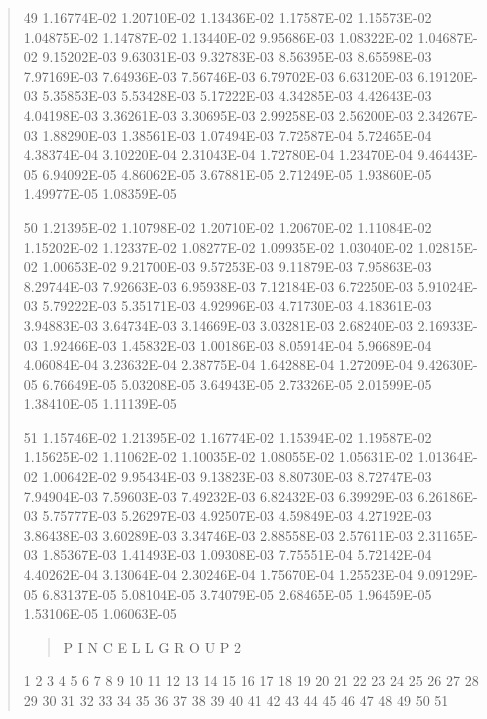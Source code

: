 \documentclass[letterpaper,10pt,english]{sphinxmanual}
\begin{document}
\begin{quote}
\begin{DUlineblock}{0em}
\item[] 49   1.16774E-02  1.20710E-02  1.13436E-02  1.17587E-02  1.15573E-02  1.04875E-02  1.14787E-02  1.13440E-02  9.95686E-03  1.08322E-02  1.04687E-02  9.15202E-03  9.63031E-03  9.32783E-03  8.56395E-03  8.65598E-03  7.97169E-03  7.64936E-03  7.56746E-03  6.79702E-03  6.63120E-03  6.19120E-03  5.35853E-03  5.53428E-03  5.17222E-03  4.34285E-03  4.42643E-03  4.04198E-03  3.36261E-03  3.30695E-03  2.99258E-03  2.56200E-03  2.34267E-03  1.88290E-03  1.38561E-03  1.07494E-03  7.72587E-04  5.72465E-04  4.38374E-04  3.10220E-04  2.31043E-04  1.72780E-04  1.23470E-04  9.46443E-05  6.94092E-05  4.86062E-05  3.67881E-05  2.71249E-05  1.93860E-05  1.49977E-05  1.08359E-05
\item[] 50   1.21395E-02  1.10798E-02  1.20710E-02  1.20670E-02  1.11084E-02  1.15202E-02  1.12337E-02  1.08277E-02  1.09935E-02  1.03040E-02  1.02815E-02  1.00653E-02  9.21700E-03  9.57253E-03  9.11879E-03  7.95863E-03  8.29744E-03  7.92663E-03  6.95938E-03  7.12184E-03  6.72250E-03  5.91024E-03  5.79222E-03  5.35171E-03  4.92996E-03  4.71730E-03  4.18361E-03  3.94883E-03  3.64734E-03  3.14669E-03  3.03281E-03  2.68240E-03  2.16933E-03  1.92466E-03  1.45832E-03  1.00186E-03  8.05914E-04  5.96689E-04  4.06084E-04  3.23632E-04  2.38775E-04  1.64288E-04  1.27209E-04  9.42630E-05  6.76649E-05  5.03208E-05  3.64943E-05  2.73326E-05  2.01599E-05  1.38410E-05  1.11139E-05
\item[] 51   1.15746E-02  1.21395E-02  1.16774E-02  1.15394E-02  1.19587E-02  1.15625E-02  1.11062E-02  1.10035E-02  1.08055E-02  1.05631E-02  1.01364E-02  1.00642E-02  9.95434E-03  9.13823E-03  8.80730E-03  8.72747E-03  7.94904E-03  7.59603E-03  7.49232E-03  6.82432E-03  6.39929E-03  6.26186E-03  5.75777E-03  5.26297E-03  4.92507E-03  4.59849E-03  4.27192E-03  3.86438E-03  3.60289E-03  3.34746E-03  2.88558E-03  2.57611E-03  2.31165E-03  1.85367E-03  1.41493E-03  1.09308E-03  7.75551E-04  5.72142E-04  4.40262E-04  3.13064E-04  2.30246E-04  1.75670E-04  1.25523E-04  9.09129E-05  6.83137E-05  5.08104E-05  3.74079E-05  2.68465E-05  1.96459E-05  1.53106E-05  1.06063E-05
\end{DUlineblock}
\begin{quote}

P I N  C E L L       G R O U P 2
\end{quote}

\begin{DUlineblock}{0em}
\item[] 1        2        3        4        5        6        7        8        9           10           11           12           13           14           15           16           17           18           19           20           21           22           23           24           25           26           27           28           29           30           31           32           33           34           35           36           37           38           39           40           41           42           43           44           45           46           47           48           49           50           51
\end{DUlineblock}


\end{quote}
\end{document}
